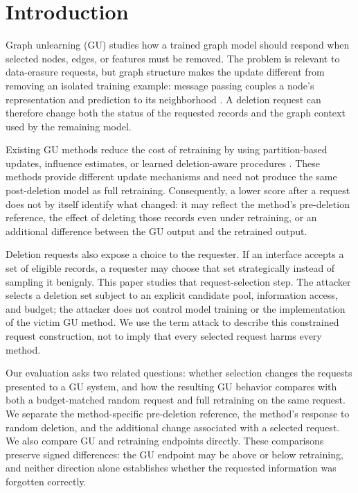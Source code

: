 \section{Introduction}
\label{sec:intro}

Graph unlearning (GU) studies how a trained graph model should respond when selected nodes, edges, or features must be removed. The problem is relevant to data-erasure requests, but graph structure makes the update different from removing an isolated training example: message passing couples a node's representation and prediction to its neighborhood \cite{gdpr2016,ccpa2018,kipf2017semi}. A deletion request can therefore change both the status of the requested records and the graph context used by the remaining model.

Existing GU methods reduce the cost of retraining by using partition-based updates, influence estimates, or learned deletion-aware procedures \cite{chen2022graph,wu2023gif,cheng2023gnndelete,li2024towards,dong2024idea}. These methods provide different update mechanisms and need not produce the same post-deletion model as full retraining. Consequently, a lower score after a request does not by itself identify what changed: it may reflect the method's pre-deletion reference, the effect of deleting those records even under retraining, or an additional difference between the GU output and the retrained output.

Deletion requests also expose a choice to the requester. If an interface accepts a set of eligible records, a requester may choose that set strategically instead of sampling it benignly. This paper studies that request-selection step. The attacker selects a deletion set subject to an explicit candidate pool, information access, and budget; the attacker does not control model training or the implementation of the victim GU method. We use the term attack to describe this constrained request construction, not to imply that every selected request harms every method.

Our evaluation asks two related questions: whether selection changes the requests presented to a GU system, and how the resulting GU behavior compares with both a budget-matched random request and full retraining on the same request. We separate the method-specific pre-deletion reference, the method's response to random deletion, and the additional change associated with a selected request. We also compare GU and retraining endpoints directly. These comparisons preserve signed differences: the GU endpoint may be above or below retraining, and neither direction alone establishes whether the requested information was forgotten correctly.

